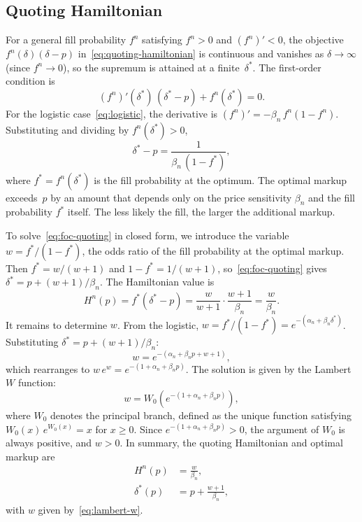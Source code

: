 \subsection{Quoting Hamiltonian}
\label{sec:model-H-quoting}

For a general fill probability $f^n$ satisfying $f^n > 0$ and $(f^n)' < 0$, the objective $f^n(\delta)(\delta - p)$ in~\eqref{eq:quoting-hamiltonian} is continuous and vanishes as $\delta \to \infty$ (since $f^n \to 0$), so the supremum is attained at a finite~$\delta^*$. The first-order condition is
\[
  (f^n)'(\delta^*)\,(\delta^* - p) + f^n(\delta^*) = 0.
\]
For the logistic case~\eqref{eq:logistic}, the derivative is $(f^n)' = -\beta_n\,f^n(1-f^n)$. Substituting and dividing by $f^n(\delta^*) > 0$,
\begin{equation}
  \label{eq:foc-quoting}
  \delta^* - p = \frac{1}{\beta_n\,(1 - f^*)},
\end{equation}
where $f^* = f^n(\delta^*)$ is the fill probability at the optimum. The optimal markup exceeds~$p$ by an amount that depends only on the price sensitivity $\beta_n$ and the fill probability $f^*$ itself. The less likely the fill, the larger the additional markup.

To solve~\eqref{eq:foc-quoting} in closed form, we introduce the variable $w = f^*\!/(1 - f^*)$, the odds ratio of the fill probability at the optimal markup. Then $f^* = w/(w+1)$ and $1 - f^* = 1/(w+1)$, so~\eqref{eq:foc-quoting} gives $\delta^* = p + (w+1)/\beta_n$. The Hamiltonian value is
\[
  H^n(p) = f^*(\delta^* - p) = \frac{w}{w+1}\cdot\frac{w+1}{\beta_n} = \frac{w}{\beta_n}.
\]
It remains to determine $w$. From the logistic, $w = f^*\!/(1-f^*) = e^{-(\alpha_n + \beta_n\delta^*)}$. Substituting $\delta^* = p + (w+1)/\beta_n$:
\[
  w = e^{-(\alpha_n + \beta_n p + w + 1)},
\]
which rearranges to $w\,e^w = e^{-(1+\alpha_n+\beta_n p)}$. The solution is given by the Lambert $W$ function:
\begin{equation}
  \label{eq:lambert-w}
  w = W_0\!\left(e^{-(1+\alpha_n+\beta_n p)}\right),
\end{equation}
where $W_0$ denotes the principal branch, defined as the unique function satisfying $W_0(x)\,e^{W_0(x)} = x$ for $x \geq 0$. Since $e^{-(1+\alpha_n+\beta_n p)} > 0$, the argument of $W_0$ is always positive, and $w > 0$. In summary, the quoting Hamiltonian and optimal markup are
\begin{align}
  H^n(p) &= \frac{w}{\beta_n}, \label{eq:H-closed}\\[3pt]
  \delta^*(p) &= p + \frac{w + 1}{\beta_n}, \label{eq:delta-star}
\end{align}
with $w$ given by~\eqref{eq:lambert-w}.

